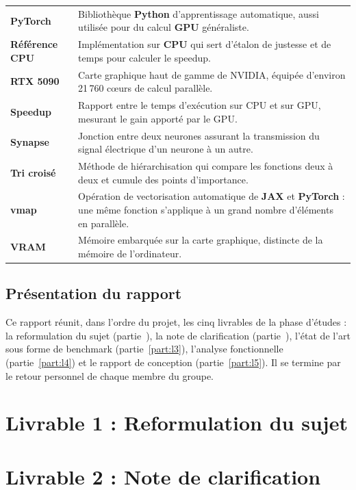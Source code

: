 \documentclass{report}
\begin{document}
\begin{longtable}{@{}p{3.9cm}p{11cm}@{}}
    \textbf{PyTorch} & Bibliothèque \textbf{Python} d'apprentissage automatique, aussi utilisée pour du calcul \textbf{GPU} généraliste. \\[6pt]
    \textbf{Référence CPU} & Implémentation sur \textbf{CPU} qui sert d'étalon de justesse et de temps pour calculer le speedup. \\[6pt]
    \textbf{RTX 5090} & Carte graphique haut de gamme de NVIDIA, équipée d'environ 21\,760 cœurs de calcul parallèle. \\[6pt]
    \textbf{Speedup} & Rapport entre le temps d'exécution sur CPU et sur GPU, mesurant le gain apporté par le GPU. \\[6pt]
    \textbf{Synapse} & Jonction entre deux neurones assurant la transmission du signal électrique d'un neurone à un autre. \\[6pt]
    \textbf{Tri croisé} & Méthode de hiérarchisation qui compare les fonctions deux à deux et cumule des points d'importance. \\[6pt]
    \textbf{vmap} & Opération de vectorisation automatique de \textbf{JAX} et \textbf{PyTorch} : une même fonction s'applique à un grand nombre d'éléments en parallèle. \\[6pt]
    \textbf{VRAM} & Mémoire embarquée sur la carte graphique, distincte de la mémoire de l'ordinateur. \\
\end{longtable}

\tableofcontents

\chapter*{Présentation du rapport}

Ce rapport réunit, dans l'ordre du projet, les cinq livrables de la phase d'études : la reformulation du sujet (partie~\ref{part:l1}), la note de clarification (partie~\ref{part:l2}), l'état de l'art sous forme de benchmark (partie~\ref{part:l3}), l'analyse fonctionnelle (partie~\ref{part:l4}) et le rapport de conception (partie~\ref{part:l5}). Il se termine par le retour personnel de chaque membre du groupe.

\part{Livrable 1 : Reformulation du sujet}
\label{part:l1}


\part{Livrable 2 : Note de clarification}
\label{part:l2}

\end{document}

